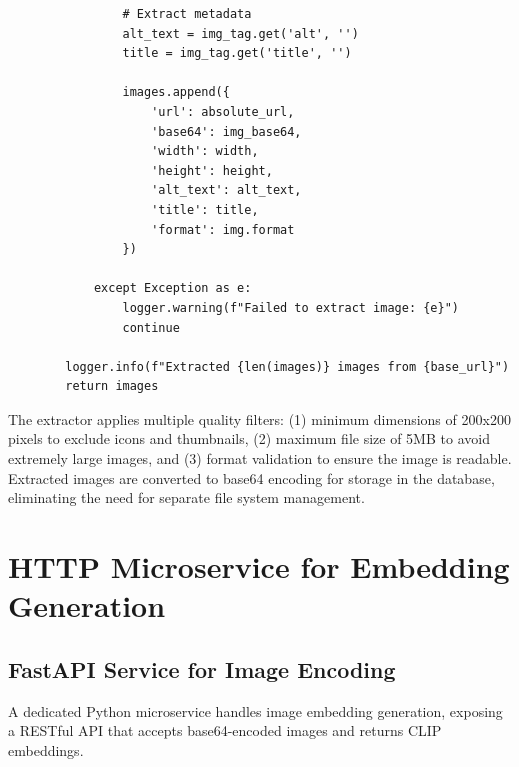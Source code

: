 \begin{lstlisting}
                # Extract metadata
                alt_text = img_tag.get('alt', '')
                title = img_tag.get('title', '')
                
                images.append({
                    'url': absolute_url,
                    'base64': img_base64,
                    'width': width,
                    'height': height,
                    'alt_text': alt_text,
                    'title': title,
                    'format': img.format
                })
                
            except Exception as e:
                logger.warning(f"Failed to extract image: {e}")
                continue
        
        logger.info(f"Extracted {len(images)} images from {base_url}")
        return images
\end{lstlisting}

The extractor applies multiple quality filters: (1) minimum dimensions of 200x200 pixels to exclude icons and thumbnails, (2) maximum file size of 5MB to avoid extremely large images, and (3) format validation to ensure the image is readable. Extracted images are converted to base64 encoding for storage in the database, eliminating the need for separate file system management.

\clearpage

\section{HTTP Microservice for Embedding Generation}

\subsection{FastAPI Service for Image Encoding}

A dedicated Python microservice handles image embedding generation, exposing a RESTful API that accepts base64-encoded images and returns CLIP embeddings.

